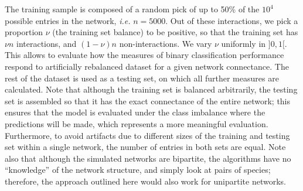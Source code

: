 \documentclass[11pt]{article}
\begin{document}
The training sample is composed of a random pick of up to 50\% of the
\(10^4\) possible entries in the network, \emph{i.e.} \(n=5000\). Out of
these interactions, we pick a proportion \(\nu\) (the training set
balance) to be positive, so that the training set has \(\nu n\)
interactions, and \((1-\nu) n\) non-interactions. We vary \(\nu\)
uniformly in \(]0,1[\). This allows to evaluate how the measures of
binary classification performance respond to artificially rebalanced
dataset for a given network connectance. The rest of the dataset is used
as a testing set, on which all further measures are calculated. Note
that although the training set is balanced arbitrarily, the testing set
is assembled so that it has the exact connectance of the entire network;
this ensures that the model is evaluated under the class imbalance where
the predictions will be made, which represents a more meaningful
evaluation. Furthermore, to avoid artifacts due to different sizes of
the training and testing set within a single network, the number of
entries in both sets are equal. Note also that although the simulated
networks are bipartite, the algorithms have no ``knowledge'' of the
network structure, and simply look at pairs of species; therefore, the
approach outlined here would also work for unipartite networks.
\end{document}
